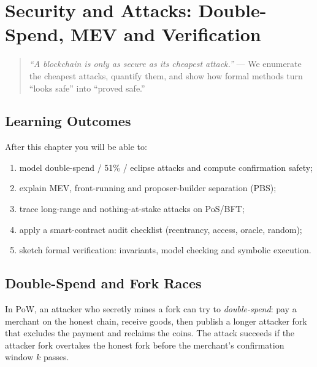 \chapter{Security and Attacks: Double-Spend, MEV and Verification}\label{ch:security}

\begin{quote}
\emph{``A blockchain is only as secure as its cheapest attack.''} --- We enumerate the cheapest attacks, quantify them, and show how formal methods turn ``looks safe'' into ``proved safe.'' 
\end{quote}

\noindent{}
\vspace{0.4em}

\section*{Learning Outcomes}
After this chapter you will be able to:
\begin{enumerate}[label=(L\arabic*)]
    \item model double-spend / 51\% / eclipse attacks and compute confirmation safety;
    \item explain MEV, front-running and proposer-builder separation (PBS);
    \item trace long-range and nothing-at-stake attacks on PoS/BFT;
    \item apply a smart-contract audit checklist (reentrancy, access, oracle, random);
    \item sketch formal verification: invariants, model checking and symbolic execution.
\end{enumerate}

\section{Double-Spend and Fork Races}\label{sec:double-spend}
In PoW, an attacker who secretly mines a fork can try to \emph{double-spend}: pay a merchant on the honest chain, receive goods, then publish a longer attacker fork that excludes the payment and reclaims the coins. The attack succeeds if the attacker fork overtakes the honest fork before the merchant's confirmation window $k$ passes.

